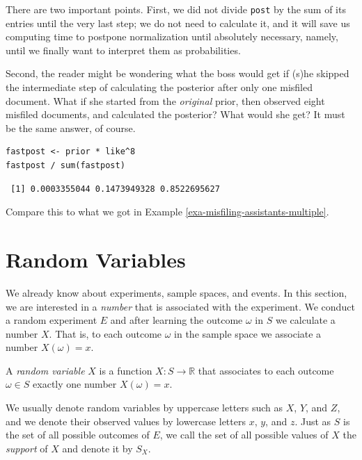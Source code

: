 \documentclass[captions=tableheading]{scrbook}
\begin{document}
There are two important points. First, we did not divide \texttt{post} by the sum of its entries until the very last step; we do not need to calculate it, and it will save us computing time to postpone normalization until absolutely necessary, namely, until we finally want to interpret them as probabilities.

Second, the reader might be wondering what the boss would get if (s)he skipped the intermediate step of calculating the posterior after only one misfiled document. What if she started from the \emph{original} prior, then observed eight misfiled documents, and calculated the posterior? What would she get? It must be the same answer, of course.


\lstset{language=R}
\begin{lstlisting}
fastpost <- prior * like^8
fastpost / sum(fastpost)
\end{lstlisting}

\begin{verbatim}
 [1] 0.0003355044 0.1473949328 0.8522695627
\end{verbatim}

Compare this to what we got in Example \ref{exa-misfiling-assistants-multiple}.
\section{Random Variables}
\label{sec-4-9}
\label{sec-Random-Variables}


We already know about experiments, sample spaces, and events. In this section, we are interested in a \emph{number} that is associated with the experiment. We conduct a random experiment \(E\) and after learning the outcome \(\omega\) in \(S\) we calculate a number \(X\). That is, to each outcome \(\omega\) in the sample space we associate a number \(X(\omega)=x\). 

\begin{defn}
A \emph{random variable} \(X\) is a function \(X:S\to\mathbb{R}\) that associates to each outcome \(\omega\in S\) exactly one number \(X(\omega)=x\). 
\end{defn}

We usually denote random variables by uppercase letters such as \(X\), \(Y\), and \(Z\), and we denote their observed values by lowercase letters \(x\), \(y\), and \(z\). Just as \(S\) is the set of all possible outcomes of \(E\), we call the set of all possible values of \(X\) the \emph{support} of \(X\) and denote it by \(S_{X}\).
\end{document}
